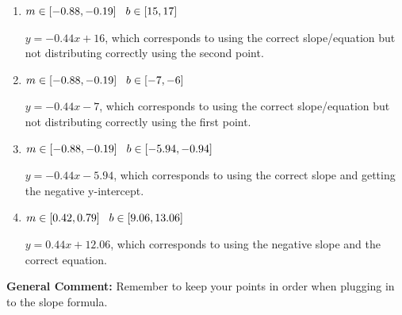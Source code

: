 \documentclass{extbook}[14pt]
\begin{document}
\begin{enumerate}
{\begin{enumerate}[label=\Alph*.]
* $y = -0.44x + 5.94$, which is the correct option.
\item \( m \in [-0.88, -0.19] \hspace*{3mm} b \in [15, 17] \)

 $y = -0.44x + 16$, which corresponds to using the correct slope/equation but not distributing correctly using the second point.
\item \( m \in [-0.88, -0.19] \hspace*{3mm} b \in [-7, -6] \)

 $y = -0.44x -7$, which corresponds to using the correct slope/equation but not distributing correctly using the first point.
\item \( m \in [-0.88, -0.19] \hspace*{3mm} b \in [-5.94, -0.94] \)

 $y = -0.44x -5.94$, which corresponds to using the correct slope and getting the negative y-intercept.
\item \( m \in [0.42, 0.79] \hspace*{3mm} b \in [9.06, 13.06] \)

 $y = 0.44x + 12.06$, which corresponds to using the negative slope and the correct equation.
\end{enumerate}

\textbf{General Comment:} Remember to keep your points in order when plugging in to the slope formula.
}
\end{enumerate}
\end{document}
